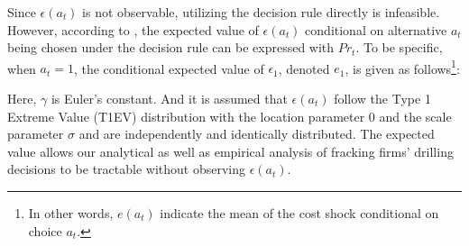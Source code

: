 Since $\epsilon(a_{t})$ is not observable, utilizing the decision rule directly is infeasible. However, according to \cite{Euler-Equations-for-the-Estimation-of-Dynamic-Discrete-Choice-Structural-Models_Aguirregabiria-and-Magesan_2013}, the expected value of $\epsilon(a_{t})$ conditional on alternative $a_{t}$ being chosen under the decision rule can be expressed with $Pr_{t}$. To be specific, when $a_{t} = 1$, the conditional expected value of $\epsilon_{1}$, denoted $e_{1}$, is given as follows\footnote{In other words, $e(a_{t})$ indicate the mean of the cost shock conditional on choice $a_{t}$.}:

Here, $\gamma$ is Euler's constant. And it is assumed that $\epsilon(a_{t})$ follow the Type 1 Extreme Value (T1EV) distribution with the location parameter 0 and the scale parameter $\sigma$ and are independently and identically distributed. The expected value allows our analytical as well as empirical analysis of fracking firms' drilling decisions to be tractable without observing $\epsilon(a_{t})$. 
